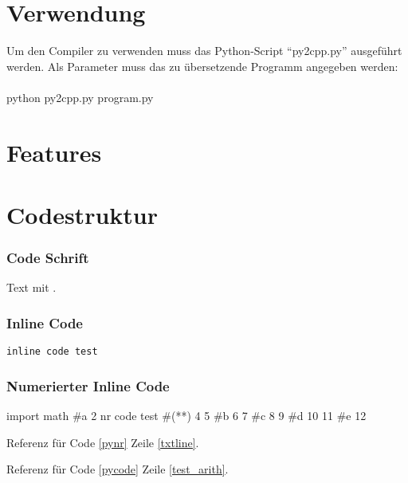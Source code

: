
\section{Verwendung}

Um den Compiler zu verwenden muss das Python-Script "`py2cpp.py"' ausgeführt werden. Als Parameter muss das zu übersetzende Programm angegeben werden: \\ \\ 
python py2cpp.py program.py\\



\section{Features}


\section{Codestruktur}

\appendix
\newpage
%

\clearpage
\listoffigures
\clearpage
\listoftables
\clearpage
\lstlistoflistings
\clearpage
\nocite{*}
\printbibliography



\subsubsection*{Code Schrift}
Text mit   .

\subsubsection*{Inline Code}
\begin{lstlisting}[caption=CAP]
inline code test
\end{lstlisting}

\vspace{4ex}
\subsubsection*{Numerierter Inline Code}
\begin{nrcode}[caption=CCC, label=pynr, linerange={a-c, d-e}]
import math
#\*a
2
nr code test #(*\label{txtline}*)
4
5
#\*b
6
7
#\*c
8
9
#\*d
10
11
#\*e
12
\end{nrcode}

Referenz für Code \ref{pynr} Zeile \ref{txtline}.

Referenz für Code \ref{pycode} Zeile \ref{test_arith}.